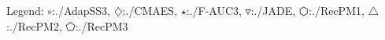 Legend: {\color{NavyBlue}$\circ$}:./AdapSS3, {\color{Magenta}$\diamondsuit$}:./CMAES, {\color{Orange}$\star$}:./F-AUC3, {\color{CornflowerBlue}$\triangledown$}:./JADE, {\color{red}$\varhexagon$}:./RecPM1, {\color{YellowGreen}$\triangle$}:./RecPM2, {\color{cyan}$\pentagon$}:./RecPM3
